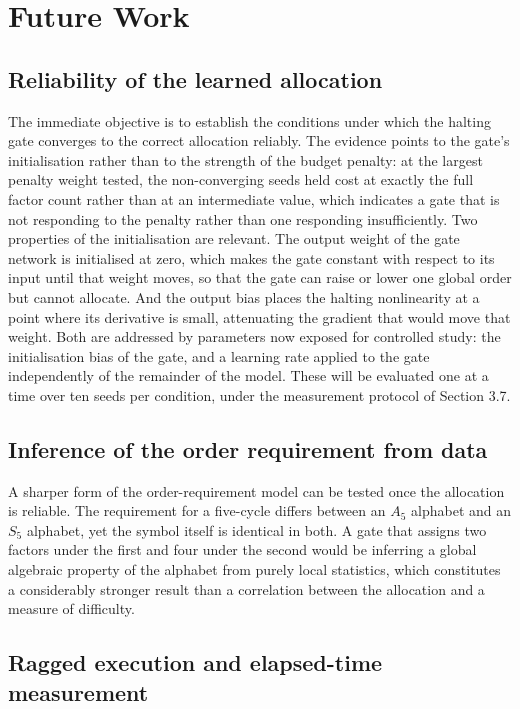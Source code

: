 \section{Future Work}

\subsection{Reliability of the learned allocation}

The immediate objective is to establish the conditions under which the halting
gate converges to the correct allocation reliably. The evidence points to the
gate's initialisation rather than to the strength of the budget penalty: at the
largest penalty weight tested, the non-converging seeds held cost at exactly the
full factor count rather than at an intermediate value, which indicates a gate
that is not responding to the penalty rather than one responding insufficiently.
Two properties of the initialisation are relevant. The output weight of the gate
network is initialised at zero, which makes the gate constant with respect to its
input until that weight moves, so that the gate can raise or lower one global
order but cannot allocate. And the output bias places the halting nonlinearity at
a point where its derivative is small, attenuating the gradient that would move
that weight. Both are addressed by parameters now exposed for controlled study:
the initialisation bias of the gate, and a learning rate applied to the gate
independently of the remainder of the model. These will be evaluated one at a
time over ten seeds per condition, under the measurement protocol of Section 3.7.

\subsection{Inference of the order requirement from data}

A sharper form of the order-requirement model can be tested once the allocation
is reliable. The requirement for a five-cycle differs between an $A_5$ alphabet
and an $S_5$ alphabet, yet the symbol itself is identical in both. A gate that
assigns two factors under the first and four under the second would be inferring
a global algebraic property of the alphabet from purely local statistics, which
constitutes a considerably stronger result than a correlation between the
allocation and a measure of difficulty.

\subsection{Ragged execution and elapsed-time measurement}

